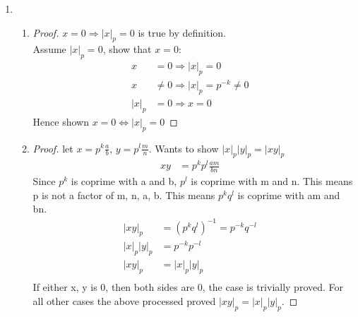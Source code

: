 \documentclass{article}
\begin{document}
\begin{enumerate}[label=\textbf{\arabic*}.]
\begin{enumerate}
\begin{proof}
				\begin{align*}
					r = \frac{a}{b} &= \frac{\pm\prod_{i=1} p_i^{k_i}}{\prod_{j=1} p_j^{e_j}}&\\
					&= p_l^{k_l}\frac{\pm\prod_{i=1, i\neq l} p_i^{k_i}}{\prod_{j=1}
					p_j^{e_j}}&\\
				\end{align*}
				Since this is of the form $p^k\frac{a}{b}$, and a,b are coprimes, $p^k$
				is taken out of the prime factors of a, therefore it is not in the prime
				factor of a or b which is coprime to a, this proves that any nonzero rational 
				number r can be written uniquely in the form $p^k\frac{a}{b}$, where k is 
				an integer, a,b, are coprime integers coprime to p, and b is positive.
				\end{proof}

			\item \quad  %
				\begin{enumerate}
					\item  %
						\begin{proof}
							$x=0 \Rightarrow |x|_p = 0$ is true by definition.\\
							Assume $|x|_p = 0$, show that $x=0$:
							\begin{align*}
								x &= 0 \Rightarrow |x|_p=0&\\
								x &\neq 0 \Rightarrow |x|_p=p^{-k} \neq 0&\\
								|x|_p &= 0 \Rightarrow x = 0 &
							\end{align*}
							Hence shown $x=0 \Leftrightarrow |x|_p = 0$
						\end{proof}

					\item  %
						\begin{proof} let $x = p^k\frac{a}{b}$, $y = p^l\frac{m}{n}$. Wants
							to show $|x|_p|y|_p = |xy|_p$
							\begin{align*}
								xy &= p^kp^l\frac{am}{bn}&
							\end{align*}
							Since $p^k$ is coprime with a and b, $p^l$ is coprime with m and
							n. This means p is not a factor of m, n, a, b. This means $p^kq^l$
							is coprime with am and bn. 
							\begin{align*}
								|xy|_p &= (p^kq^l)^{-1} = p^{-k}q^{-l}&\\
								|x|_p|y|_p &= p^{-k}p^{-l}&\\
								|xy|_p &= |x|_p|y|_p&\\
							\end{align*}
							If either x, y is 0, then both sides are 0, the case is trivially
							proved. For all other cases the above processed proved $|xy|_p =
							|x|_p|y|_p$.
						\end{proof}


\end{enumerate}
\end{enumerate}
\end{enumerate}
\end{document}
